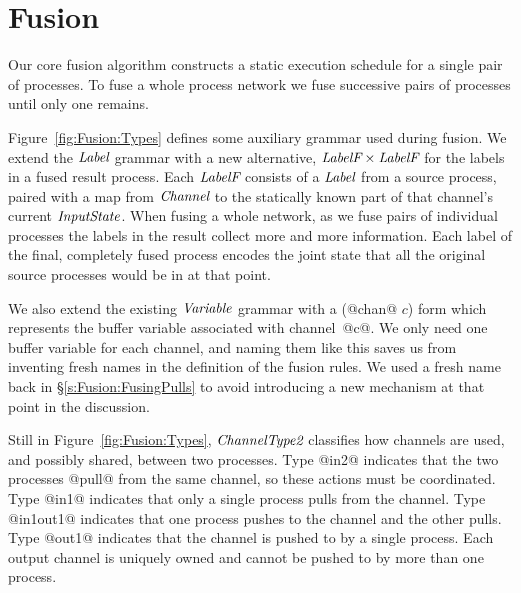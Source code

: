 
\section{Fusion}
\label{s:Fusion}

Our core fusion algorithm constructs a static execution schedule for a single pair of processes. To fuse a whole process network we fuse successive pairs of processes until only one remains. 

Figure~\ref{fig:Fusion:Types} defines some auxiliary grammar used during fusion. We extend the $\textit{Label}$ grammar with a new alternative, $\textit{LabelF} \times \textit{LabelF}$ for the labels in a fused result process. Each $\textit{LabelF}$ consists of a $\textit{Label}$ from a source process, paired with a map from $\textit{Channel}$ to the statically known part of that channel's current $\textit{InputState}$. When fusing a whole network, as we fuse pairs of individual processes the labels in the result collect more and more information. Each label of the final, completely fused process encodes the joint state that all the original source processes would be in at that point.



We also extend the existing $\textit{Variable}$ grammar with a (@chan@ $c$) form which represents the buffer variable associated with \mbox{channel @c@}. We only need one buffer variable for each channel, and naming them like this saves us from inventing fresh names in the definition of the fusion rules.
We used a fresh name back in \S\ref{s:Fusion:FusingPulls} to avoid introducing a new mechanism at that point in the discussion.

Still in Figure~\ref{fig:Fusion:Types}, $\textit{ChannelType2}$ classifies how channels are used, and possibly shared, between two processes. Type @in2@ indicates that the two processes @pull@ from the same channel, so these actions must be coordinated. Type @in1@ indicates that only a single process pulls from the channel. Type @in1out1@ indicates that one process pushes to the channel and the other pulls. Type @out1@ indicates that the channel is pushed to by a single process. Each output channel is uniquely owned and cannot be pushed to by more than one process.

